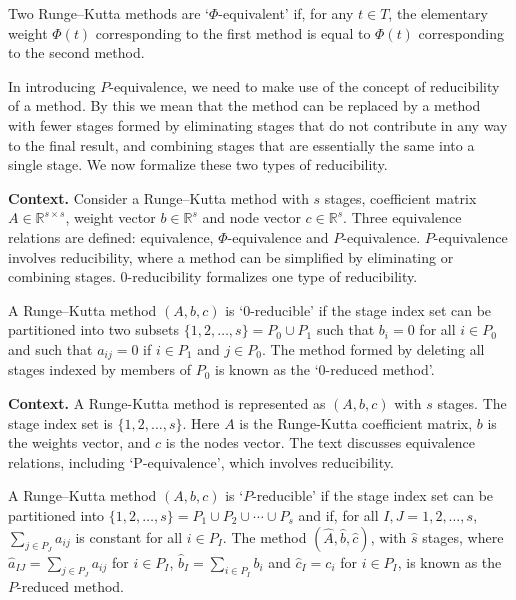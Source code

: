 \begin{definition}[Φ-equivalent (381B)]

  \label{def:381B}
  \uses{}
Two Runge--Kutta methods are `$\Phi$-equivalent' if, for any $t \in T$, the elementary weight $\Phi(t)$ corresponding to the first method is equal to $\Phi(t)$ corresponding to the second method.

In introducing $P$-equivalence, we need to make use of the concept of reducibility of a method. By this we mean that the method can be replaced by a method with fewer stages formed by eliminating stages that do not contribute in any way to the final result, and combining stages that are essentially the same into a single stage. We now formalize these two types of reducibility.
\end{definition}

\noindent\textbf{Context.}
Consider a Runge--Kutta method with $s$ stages, coefficient matrix $A\in\mathbb{R}^{s\times s}$, weight vector $b\in\mathbb{R}^{s}$ and node vector $c\in\mathbb{R}^{s}$.  
Three equivalence relations are defined: equivalence, $\Phi$-equivalence and $P$-equivalence.  
$P$-equivalence involves reducibility, where a method can be simplified by eliminating or combining stages.  
$0$-reducibility formalizes one type of reducibility.

\begin{definition}

  \label{def:381C}
A Runge--Kutta method $(A, b, c)$ is `0-reducible' if the stage index set can be partitioned into two subsets $\{1, 2, \dots, s\} = P_0 \cup P_1$ such that $b_i = 0$ for all $i \in P_0$ and such that $a_{ij} = 0$ if $i \in P_1$ and $j \in P_0$. The method formed by deleting all stages indexed by members of $P_0$ is known as the `0-reduced method'.
\end{definition}

\noindent\textbf{Context.}
A Runge-Kutta method is represented as $(A, b, c)$ with $s$ stages. The stage index set is $\{1, 2, \dots, s\}$. Here $A$ is the Runge-Kutta coefficient matrix, $b$ is the weights vector, and $c$ is the nodes vector. The text discusses equivalence relations, including `P-equivalence', which involves reducibility.

\begin{definition}[P -reducible (381D)]

  \label{def:381D}
  \uses{}
A Runge--Kutta method $(A, b, c)$ is `$P$-reducible' if the stage index set can be partitioned into $\{1, 2, \dots, s\} = P_1 \cup P_2 \cup \cdots \cup P_s$ and if, for all $I, J = 1, 2, \dots, s$, $\sum_{j \in P_J} a_{ij}$ is constant for all $i \in P_I$. The method $(\widehat{A}, \widehat{b}, \widehat{c})$, with $\widehat{s}$ stages, where $\widehat{a}_{IJ} = \sum_{j \in P_J} a_{ij}$ for $i \in P_I$, $\widehat{b}_I = \sum_{i \in P_I} b_i$ and $\widehat{c}_I = c_i$ for $i \in P_I$, is known as the $P$-reduced method.
\end{definition}

